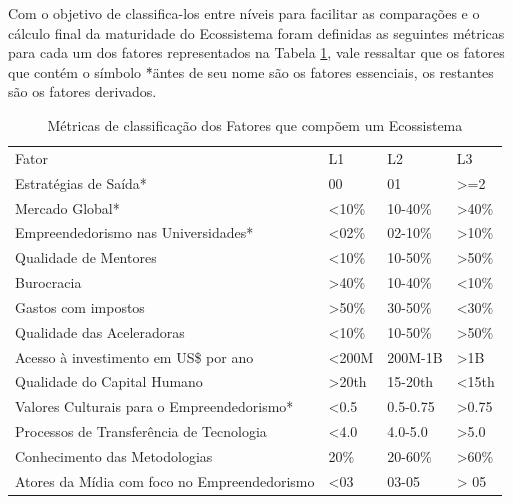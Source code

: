 Com o objetivo de classifica-los entre níveis para facilitar as comparações e o cálculo final da maturidade do Ecossistema foram definidas as seguintes métricas para cada um dos fatores representados na Tabela \ref{tabela:metricas_de_classificacao_dos_fatores}, vale ressaltar que os fatores que contém o símbolo \"*\" antes de seu nome são os fatores essenciais, os restantes são os fatores derivados.

\begin{table}[!htb]
\centering
\caption{Métricas de classificação dos Fatores que compõem um Ecossistema}
\label{tabela:metricas_de_classificacao_dos_fatores}
\begin{tabular}{llll}
Fator                                                      &     L1     &     L2     &     L3      \\
Estratégias de Saída*                                      &     00     &     01     &    >=2      \\
Mercado Global*                                            &    <10\%   &   10-40\%  &    >40\%    \\
Empreendedorismo nas Universidades*                        &    <02\%   &   02-10\%  &    >10\%    \\
Qualidade de Mentores                                      &    <10\%   &   10-50\%  &    >50\%    \\
Burocracia                                                 &    >40\%   &   10-40\%  &    <10\%    \\
Gastos com impostos                                        &    >50\%   &   30-50\%  &    <30\%    \\
Qualidade das Aceleradoras                                 &    <10\%   &   10-50\%  &    >50\%    \\
Acesso à investimento em US\$ por ano                      &    <200M   &   200M-1B  &    >1B      \\
Qualidade do Capital Humano                                &    >20th   &   15-20th  &    <15th    \\
Valores Culturais para o Empreendedorismo*                 &    <0.5    &   0.5-0.75 &    >0.75    \\
Processos de Transferência de Tecnologia                   &    <4.0    &   4.0-5.0  &    >5.0     \\
Conhecimento das Metodologias                              &    20\%    &   20-60\%  &    >60\%    \\
Atores da Mídia com foco no Empreendedorismo               &    <03     &   03-05    &    > 05     \\

\end{tabular}
\end{table}
